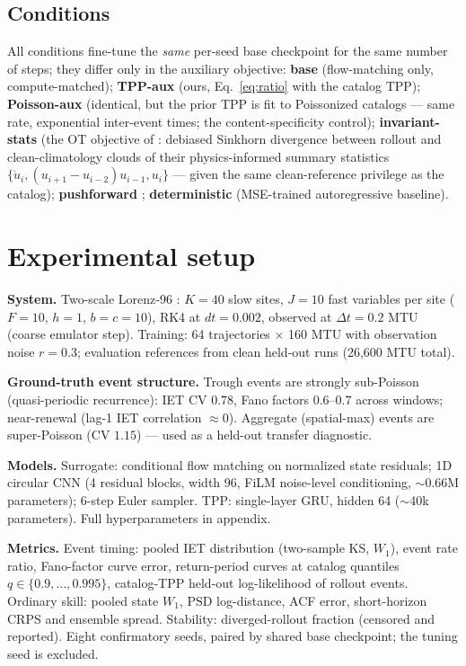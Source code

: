 \documentclass[11pt]{article}
\begin{document}
\subsection{Conditions}
\label{sec:conditions}

All conditions fine-tune the \emph{same} per-seed base checkpoint for the
same number of steps; they differ only in the auxiliary objective:
\textbf{base} (flow-matching only, compute-matched);
\textbf{TPP-aux} (ours, Eq.~\ref{eq:ratio} with the catalog TPP);
\textbf{Poisson-aux} (identical, but the prior TPP is fit to Poissonized
catalogs --- same rate, exponential inter-event times; the
content-specificity control);
\textbf{invariant-stats} (the OT objective of \citet{jiang2023training}:
debiased Sinkhorn divergence between rollout and clean-climatology clouds of
their physics-informed summary statistics $\{\dot u_i,
(u_{i+1}-u_{i-2})u_{i-1}, u_i\}$ --- given the same clean-reference
privilege as the catalog);
\textbf{pushforward} \citep{brandstetter2022message};
\textbf{deterministic} (MSE-trained autoregressive baseline).

\section{Experimental setup}
\label{sec:setup}

\textbf{System.} Two-scale Lorenz-96 \citep{lorenz1996predictability,
wilks2005effects}: $K{=}40$ slow sites, $J{=}10$ fast variables per site
($F{=}10$, $h{=}1$, $b{=}c{=}10$), RK4 at $dt{=}0.002$, observed at
$\Delta t = 0.2$ MTU (coarse emulator step). Training: 64 trajectories
$\times$ 160 MTU with observation noise $r{=}0.3$; evaluation references
from clean held-out runs (26{,}600 MTU total).

\textbf{Ground-truth event structure.} Trough events are strongly
sub-Poisson (quasi-periodic recurrence): IET CV $0.78$, Fano factors
$0.6$--$0.7$ across windows; near-renewal (lag-1 IET correlation
$\approx 0$). Aggregate (spatial-max) events are super-Poisson (CV $1.15$)
--- used as a held-out transfer diagnostic.

\textbf{Models.} Surrogate: conditional flow matching
\citep{lipman2023flow} on normalized state residuals; 1D circular CNN
(4 residual blocks, width 96, FiLM noise-level conditioning, $\sim$0.66M
parameters); 6-step Euler sampler. TPP: single-layer GRU, hidden 64
($\sim$40k parameters). Full hyperparameters in appendix.

\textbf{Metrics.} Event timing: pooled IET distribution (two-sample KS,
$W_1$), event rate ratio, Fano-factor curve error, return-period curves at
catalog quantiles $q \in \{0.9,\dots,0.995\}$, catalog-TPP held-out
log-likelihood of rollout events. Ordinary skill: pooled state $W_1$, PSD
log-distance, ACF error, short-horizon CRPS and ensemble spread. Stability:
diverged-rollout fraction (censored and reported). Eight confirmatory
seeds, paired by shared base checkpoint; the tuning seed is excluded.
\end{document}
